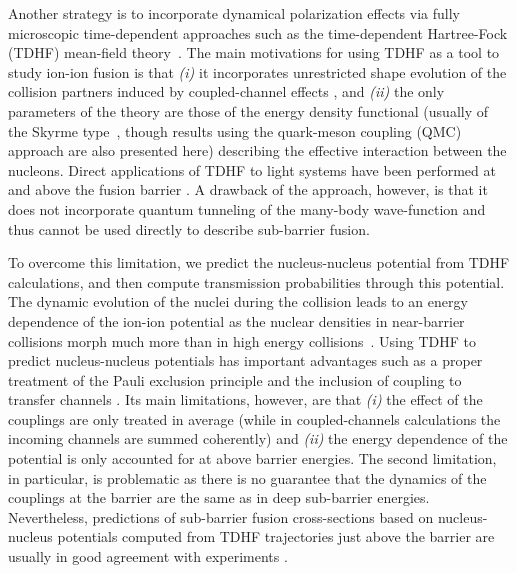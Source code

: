 Another strategy is to incorporate dynamical polarization effects via fully microscopic time-dependent approaches 
such as the time-dependent Hartree-Fock (TDHF) mean-field theory~\protect\citep{negele1982,simenel2012,simenel2018}. 
The main motivations for using TDHF as a tool to study ion-ion fusion is that 
{\it (i)} it incorporates unrestricted shape evolution of the collision partners induced by coupled-channel effects \protect\citep{simenel2013b}, and
{\it (ii)} the only parameters of the theory are those of the energy density functional (usually of the Skyrme type~\protect\citep{skyrme1956}, though results using the quark-meson coupling (QMC)~\protect\citep{guichon1988,guichon1996,stone2016} approach are also presented here) 
describing the effective interaction between the nucleons. 
Direct applications of TDHF to light systems have been performed at and above the fusion barrier \protect\citep{bonche1978,lebhertz2012,simenel2013a}. 
A drawback of the approach, however, is that it does not incorporate quantum tunneling of the many-body wave-function 
and thus cannot be used directly to describe sub-barrier fusion. 

To overcome this limitation, we predict the nucleus-nucleus potential from TDHF calculations, and then compute transmission probabilities through this potential. 
The dynamic evolution of the nuclei during the collision leads to an energy dependence of the ion-ion potential as the nuclear densities 
in near-barrier collisions morph much more than in high energy collisions~\protect\citep{washiyama2008,umar2014a,jiang2014}. 
Using TDHF to predict nucleus-nucleus potentials has important advantages such as a proper treatment of the Pauli exclusion principle \protect\citep{simenel2017} 
and the inclusion of coupling to transfer channels \protect\citep{godbey2017}.
Its main limitations, however, are that {\it (i)} the effect of the couplings are only treated in average 
(while in coupled-channels calculations the incoming channels are summed coherently) and 
{\it (ii)} the energy dependence of the potential is only accounted for at above barrier energies.
The second limitation, in particular, is problematic as there is no guarantee that the dynamics of the couplings at the barrier are the same as in deep sub-barrier energies. 
Nevertheless, predictions of sub-barrier fusion cross-sections based on nucleus-nucleus potentials computed from TDHF trajectories just above the barrier 
are usually in good agreement with experiments \protect\citep{umar2012a,umar2009b,keser2012,simenel2013a}.

